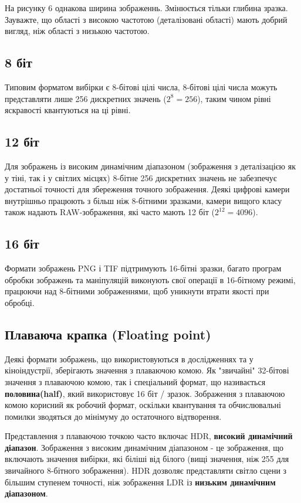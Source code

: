 \documentclass[a4paper,12pt]{article}
\begin{document}
    На рисунку 6 однакова ширина зображеннь.
    Змінюється тільки глибина зразка.
    Зауважте, що області з високою частотою (деталізовані області) мають добрий вигляд, ніж області з низькою частотою.

    \subsection{8 біт}\label{subsec:bit_eight}
    Типовим форматом вибірки є 8-бітові цілі числа, 8-бітові цілі числа можуть представляти лише 256 дискретних значень (\(2^{8} = 256\)), таким чином рівні яскравості квантуються на ці рівні.

    \subsection{12 біт}\label{subsec:bit_twelve}
    Для зображень із високим динамічним діапазоном (зображення з деталізацією як у тіні, так і у світлих місцях) 8-бітне 256 дискретних значень не забезпечує достатньої точності для збереження точного зображення.
    Деякі цифрові камери внутрішньо працюють з більш ніж 8-бітними зразками, камери вищого класу також надають RAW-зображення, які часто мають 12 біт (\(2^{12} = 4096\)).

    \subsection{16 біт}\label{subsec:bit_sixteen}
    Формати зображень PNG і TIF підтримують 16-бітні зразки, багато програм обробки зображень та маніпуляцій виконують свої операції в 16-бітному режимі, працюючи над 8-бітними зображеннями, щоб уникнути втрати якості при обробці.

    \subsection{Плаваюча крапка (Floating point)}\label{subsec:floating_point}
    Деякі формати зображень, що використовуються в дослідженнях та у кіноіндустрії, зберігають значення з плаваючою комою.
    Як "звичайні" 32-бітові значення з плаваючою комою, так і спеціальний формат, що називається \textbf{половина(half)}, який використовує 16 біт / зразок.
    Зображення з плаваючою комою корисний як робочий формат, оскільки квантування та обчислювальні помилки зводяться до мінімуму до остаточного відтворення.

    Представлення з плаваючою точкою часто включає HDR, \textbf{високий динамічний діапазон}.
    Зображення з високим динамічним діапазоном - це зображення, що включають значення вибірки, які біліші від білого (вищі значення, ніж 255 для звичайного 8-бітного зображення).
    HDR дозволяє представляти світло сцени з більшим ступенем точності, ніж зображення LDR із \textbf{низьким динамічним діапазоном}.
\end{document}
